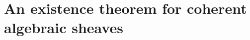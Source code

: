 \section{An existence theorem for coherent algebraic sheaves}
\label{section-an-existence-theorem-for-coherent-algebraic-sheaves}

